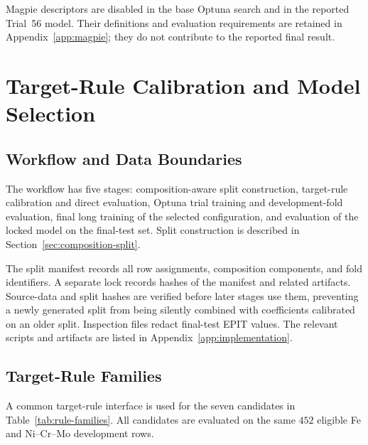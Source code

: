 \documentclass{article}
\begin{document}
Magpie descriptors are disabled in the base Optuna search and in the reported
Trial~56 model. Their definitions and evaluation requirements are retained in
Appendix~\ref{app:magpie}; they do not contribute to the reported final result.

\section{Target-Rule Calibration and Model Selection}
\label{sec:model-selection}

\subsection{Workflow and Data Boundaries}

The workflow has five stages: composition-aware split construction,
target-rule calibration and direct evaluation, Optuna trial training and
development-fold evaluation, final long training of the selected
configuration, and evaluation of the locked model on the final-test set.
Split construction is described in Section~\ref{sec:composition-split}.

The split manifest records all row assignments, composition components, and
fold identifiers. A separate lock records hashes of the manifest and related
artifacts. Source-data and split hashes are verified before later stages use
them, preventing a newly generated split from being silently combined with
coefficients calibrated on an older split. Inspection files redact final-test
EPIT values. The relevant scripts and artifacts are listed in
Appendix~\ref{app:implementation}.

\subsection{Target-Rule Families}

A common target-rule interface is used for the seven candidates in
Table~\ref{tab:rule-families}. All candidates are evaluated on the same
\(452\) eligible Fe and Ni--Cr--Mo development rows.
\end{document}
